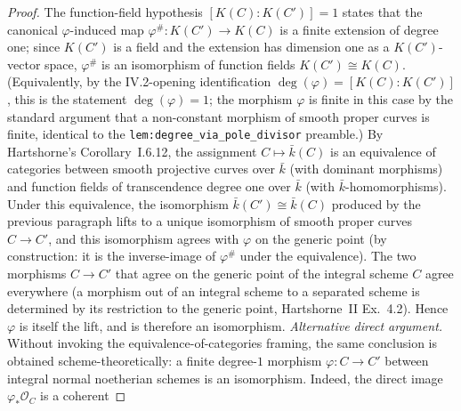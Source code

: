 \begin{proof}



\leanok
  The function-field hypothesis \([K(C) : K(C')] = 1\) states that the
  canonical \(\varphi\)-induced map \(\varphi^\# \colon K(C') \to K(C)\) is a
  finite extension of degree one; since \(K(C')\) is a field and the
  extension has dimension one as a \(K(C')\)-vector space, \(\varphi^\#\) is
  an isomorphism of function fields \(K(C') \cong K(C)\). (Equivalently, by
  the IV.2-opening identification \(\deg(\varphi) = [K(C):K(C')]\), this is
  the statement \(\deg(\varphi) = 1\); the morphism \(\varphi\) is finite in
  this case by the standard argument that a non-constant morphism of
  smooth proper curves is finite, identical to the
  \texttt{lem:degree_via_pole_divisor} preamble.)
  By Hartshorne's Corollary~I.6.12, the assignment \(C \mapsto \bar k(C)\) is
  an equivalence of categories between smooth projective curves over $\bar
  k$ (with dominant morphisms) and function fields of transcendence degree
  one over \(\bar k\) (with \(\bar k\)-homomorphisms). Under this equivalence,
  the isomorphism \(\bar k(C') \cong \bar k(C)\) produced by the previous
  paragraph lifts to a unique isomorphism of smooth proper curves $C \to
  C'$, and this isomorphism agrees with $\varphi$ on the generic point (by
  construction: it is the inverse-image of \(\varphi^\#\) under the
  equivalence). The two morphisms \(C \to C'\) that agree on the generic
  point of the integral scheme \(C\) agree everywhere (a morphism out of an
  integral scheme to a separated scheme is determined by its restriction
  to the generic point, Hartshorne~II Ex.~4.2). Hence \(\varphi\) is itself
  the lift, and is therefore an isomorphism.
  \emph{Alternative direct argument.} Without invoking the
  equivalence-of-categories framing, the same conclusion is obtained
  scheme-theoretically: a finite degree-\(1\) morphism $\varphi \colon C \to
  C'$ between integral normal noetherian schemes is an isomorphism.
  Indeed, the direct image \(\varphi_* \mathcal O_C\) is a coherent

\end{proof}
